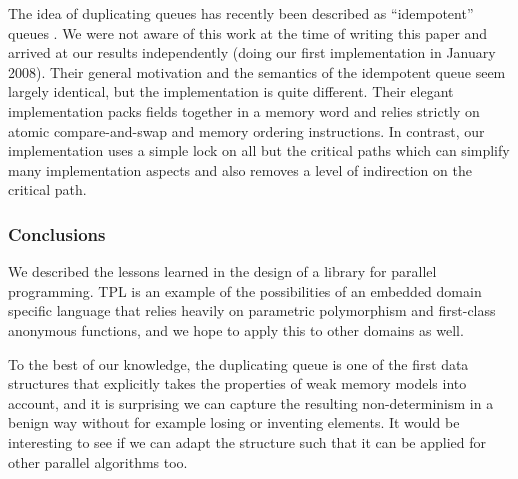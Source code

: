 The idea of duplicating queues has recently been described as
``idempotent'' queues \cite{Michael2009}. We were not aware of this
work at the time of writing this paper and arrived at our results
independently (doing our first implementation in January 2008). Their
general motivation and the semantics of the idempotent queue seem
largely identical, but the implementation is quite different. Their
elegant implementation packs fields together in a memory word and
relies strictly on atomic compare-and-swap and memory ordering
instructions. In contrast, our implementation uses a simple lock on
all but the critical paths which can simplify many implementation
aspects and also removes a level of indirection on the critical path.

\subsubsection{Conclusions}

We described the lessons learned in the design of a library for
parallel programming. TPL is an example of the possibilities of an
embedded domain specific language that relies heavily on parametric
polymorphism and first-class anonymous functions, and we hope to apply
this to other domains as well.

To the best of our knowledge, the duplicating queue is one of the
first data structures that explicitly takes the properties of weak
memory models into account, and it is surprising we can capture the
resulting non-determinism in a benign way without for example losing
or inventing elements. It would be interesting to see if we can adapt
the structure such that it can be applied for other parallel
algorithms too.












